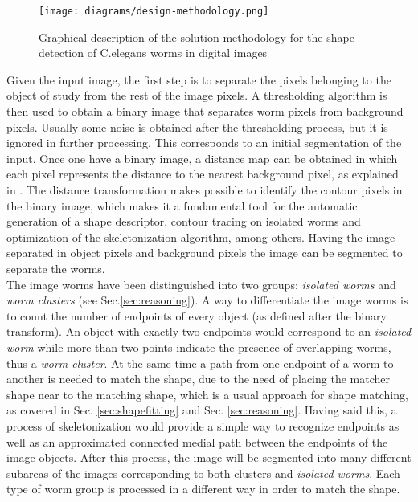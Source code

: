 \begin{figure}[h t b p ! H]
 \centering
   \texttt{[image: diagrams/design-methodology.png]}
 \caption{Graphical description of the solution methodology for the shape detection
 of C.elegans worms in digital images}
\label{fig:methsol}
\end{figure}

Given the input image, the first step is to separate the pixels belonging to the object
of study from the rest of the image pixels. A thresholding algorithm is then used to
obtain a binary image that separates worm pixels from background pixels. Usually some
noise is obtained after the thresholding process, but it is ignored in further processing.
This corresponds to an initial segmentation of the input. Once one have a binary image, a
distance map can be obtained in which each pixel represents the distance to the 
nearest background pixel, as explained in \cite{dtresearch}. The distance transformation
makes possible to identify the contour pixels in the binary image, which makes it a fundamental
tool for the automatic generation of a shape descriptor, contour tracing on isolated worms 
and optimization of the skeletonization algorithm, among others. Having the image 
separated in object pixels and background pixels the image can be segmented to separate
the worms. \\

The image worms have been distinguished into two groups: \emph{isolated worms}
and \emph{worm clusters} (see Sec.\ref{sec:reasoning}). A way to differentiate the image worms
is to count the number of endpoints of every object (as defined after the binary transform).
An object with exactly two endpoints would correspond to an \emph{isolated worm} while
more than two points indicate the presence of overlapping worms, thus a \emph{worm cluster}.
At the same time a path from one endpoint of a worm to another is needed to match
the shape, due to the need of placing the matcher shape near to the matching shape, which
is a usual approach for shape matching, as covered in Sec. \ref{sec:shapefitting} and
Sec. \ref{sec:reasoning}. Having said this, a process of skeletonization would provide a simple
way to recognize endpoints as well as an approximated connected medial path between the
endpoints of the image objects. After this process, the image will be segmented into 
many different subareas of the images corresponding to both clusters and \emph{isolated
worms}. Each type of worm group is processed in a different way in order to match
the shape.\\


